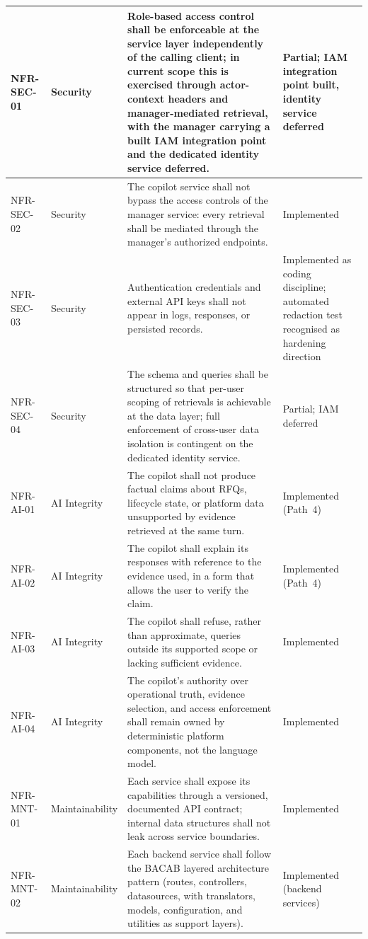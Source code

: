\begin{xltabular}{\textwidth}{|p{2.2cm}|p{2.7cm}|>{\RaggedRight\arraybackslash}X|p{2.7cm}|}
NFR-SEC-01 & Security & Role-based access control shall be enforceable at the service layer independently of the calling client; in current scope this is exercised through actor-context headers and manager-mediated retrieval, with the manager carrying a built IAM integration point and the dedicated identity service deferred. & Partial; IAM integration point built, identity service deferred \\ \hline
NFR-SEC-02 & Security & The copilot service shall not bypass the access controls of the manager service: every retrieval shall be mediated through the manager's authorized endpoints. & Implemented \\ \hline
NFR-SEC-03 & Security & Authentication credentials and external API keys shall not appear in logs, responses, or persisted records. & Implemented as coding discipline; automated redaction test recognised as hardening direction \\ \hline
NFR-SEC-04 & Security & The schema and queries shall be structured so that per-user scoping of retrievals is achievable at the data layer; full enforcement of cross-user data isolation is contingent on the dedicated identity service. & Partial; IAM deferred \\ \hline
NFR-AI-01 & AI Integrity & The copilot shall not produce factual claims about RFQs, lifecycle state, or platform data unsupported by evidence retrieved at the same turn. & Implemented (Path~4) \\ \hline
NFR-AI-02 & AI Integrity & The copilot shall explain its responses with reference to the evidence used, in a form that allows the user to verify the claim. & Implemented (Path~4) \\ \hline
NFR-AI-03 & AI Integrity & The copilot shall refuse, rather than approximate, queries outside its supported scope or lacking sufficient evidence. & Implemented \\ \hline
NFR-AI-04 & AI Integrity & The copilot's authority over operational truth, evidence selection, and access enforcement shall remain owned by deterministic platform components, not the language model. & Implemented \\ \hline
NFR-MNT-01 & Maintainability & Each service shall expose its capabilities through a versioned, documented API contract; internal data structures shall not leak across service boundaries. & Implemented \\ \hline
NFR-MNT-02 & Maintainability & Each backend service shall follow the BACAB layered architecture pattern (routes, controllers, datasources, with translators, models, configuration, and utilities as support layers). & Implemented (backend services) \\ \hline

\end{xltabular}

